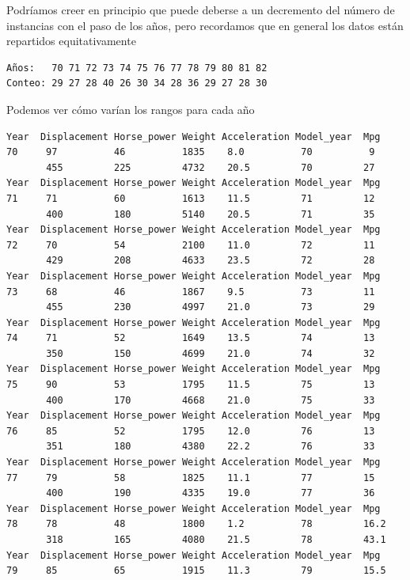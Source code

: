 \vspace{\baselineskip}

Podríamos creer en principio que puede deberse a un decremento del número de instancias con el paso de los años, pero recordamos que en general los datos están repartidos equitativamente

\begin{verbatim}
Años:   70 71 72 73 74 75 76 77 78 79 80 81 82 
Conteo: 29 27 28 40 26 30 34 28 36 29 27 28 30 
\end{verbatim}

Podemos ver cómo varían los rangos para cada año

\begin{verbatim}
Year  Displacement Horse_power Weight Acceleration Model_year  Mpg
70     97          46          1835    8.0          70          9
       455         225         4732    20.5         70         27
Year  Displacement Horse_power Weight Acceleration Model_year  Mpg
71     71          60          1613    11.5         71         12
       400         180         5140    20.5         71         35
Year  Displacement Horse_power Weight Acceleration Model_year  Mpg
72     70          54          2100    11.0         72         11
       429         208         4633    23.5         72         28
Year  Displacement Horse_power Weight Acceleration Model_year  Mpg
73     68          46          1867    9.5          73         11
       455         230         4997    21.0         73         29
Year  Displacement Horse_power Weight Acceleration Model_year  Mpg
74     71          52          1649    13.5         74         13
       350         150         4699    21.0         74         32
Year  Displacement Horse_power Weight Acceleration Model_year  Mpg
75     90          53          1795    11.5         75         13
       400         170         4668    21.0         75         33
Year  Displacement Horse_power Weight Acceleration Model_year  Mpg
76     85          52          1795    12.0         76         13
       351         180         4380    22.2         76         33
Year  Displacement Horse_power Weight Acceleration Model_year  Mpg
77     79          58          1825    11.1         77         15
       400         190         4335    19.0         77         36
Year  Displacement Horse_power Weight Acceleration Model_year  Mpg
78     78          48          1800    1.2          78         16.2
       318         165         4080    21.5         78         43.1
Year  Displacement Horse_power Weight Acceleration Model_year  Mpg
79     85          65          1915    11.3         79         15.5

\end{verbatim}
